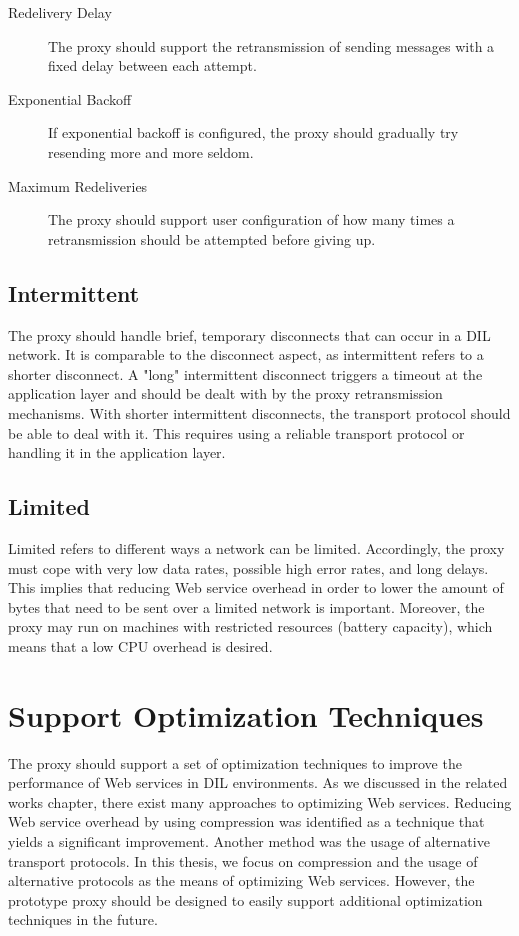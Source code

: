 \begin{description}

    \item[Redelivery Delay] The proxy should support the retransmission of
    sending messages with a fixed delay between each attempt.

    \item[Exponential Backoff] If exponential backoff is configured, the proxy
    should gradually try resending more and more seldom.

    \item[Maximum Redeliveries] The proxy should support user configuration of
    how many times a retransmission should be attempted before giving up.

\end{description}


\subsection{Intermittent}

The proxy should handle brief, temporary disconnects that can occur in a DIL
network. It is comparable to the disconnect aspect, as intermittent refers to a
shorter disconnect. A "long" intermittent disconnect triggers a timeout at the
application layer and should be dealt with by the proxy retransmission
mechanisms. With shorter intermittent disconnects, the transport protocol should
be able to deal with it. This requires using a reliable transport protocol or
handling it in the application layer.

\subsection{Limited}

Limited refers to different ways a network can be limited. Accordingly, the
proxy must cope with very low data rates, possible high error rates, and long
delays. This implies that reducing Web service overhead in order to lower the
amount of bytes that need to be sent over a limited network is important.
Moreover, the proxy may run on machines with restricted resources (battery
capacity), which means that a low CPU overhead is desired.

\section{Support Optimization Techniques}

The proxy should support a set of optimization techniques to improve the
performance of Web services in DIL environments. As we discussed in the related
works chapter, there exist many approaches to optimizing Web services. Reducing
Web service overhead by using compression was identified as a technique that
yields a significant improvement. Another method was the usage of alternative
transport protocols. In this thesis, we focus on compression and the usage of
alternative protocols as the means of optimizing Web services. However, the
prototype proxy should be designed to easily support additional optimization
techniques in the future.

